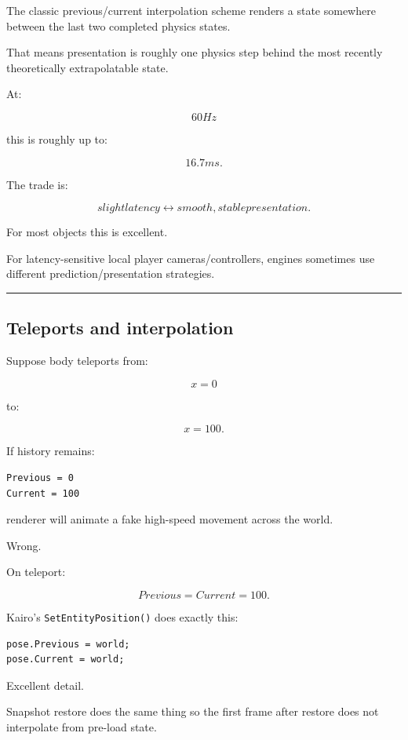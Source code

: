 The classic previous/current interpolation scheme renders a state somewhere between the last two completed physics states.

That means presentation is roughly one physics step behind the most recently theoretically extrapolatable state.

At:

\[
60Hz
\]

this is roughly up to:

\[
16.7ms.
\]

The trade is:

\[
\boxed{
slight latency
\leftrightarrow
smooth, stable presentation.
}
\]

For most objects this is excellent.

For latency-sensitive local player cameras/controllers, engines sometimes use different prediction/presentation strategies.

\begin{center}\rule{0.5\linewidth}{0.5pt}\end{center}

\subsection{Teleports and interpolation}\label{06-engine-ii-ch037-teleports-and-interpolation}

Suppose body teleports from:

\[
x=0
\]

to:

\[
x=100.
\]

If history remains:

\begin{verbatim}
Previous = 0
Current = 100
\end{verbatim}

renderer will animate a fake high-speed movement across the world.

Wrong.

On teleport:

\[
Previous=Current=100.
\]

Kairo's \texttt{SetEntityPosition()} does exactly this:

\begin{verbatim}
pose.Previous = world;
pose.Current = world;
\end{verbatim}

Excellent detail.

Snapshot restore does the same thing so the first frame after restore does not interpolate from pre-load state.

